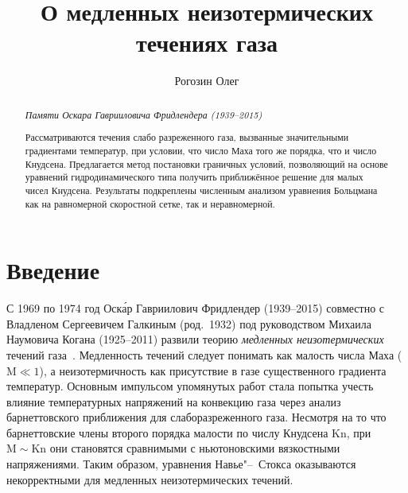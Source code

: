 \documentclass[10pt]{article}
\title{О медленных неизотермических течениях газа}
\author{Рогозин Олег}
\date{}
\newcommand{\Kn}{\mathrm{Kn}}
\newcommand{\Ma}{\mathrm{M}}
\begin{document}
\maketitle
\begin{abstract}
\begin{flushright}
\vspace{1em}
{\it Памяти Оскара Гаврииловича Фридлендера (1939--2015)}
\vspace{1em}
\end{flushright}
Рассматриваются течения слабо разреженного газа, вызванные значительными градиентами температур,
при условии, что число Маха того же порядка, что и число Кнудсена.
Предлагается метод постановки граничных условий,
позволяющий на основе уравнений гидродинамического типа
получить приближённое решение для малых чисел Кнудсена.
Результаты подкреплены численным анализом уравнения Больцмана
как на равномерной скоростной сетке, так и неравномерной.
\end{abstract}

\tableofcontents

\section{Введение}

С 1969 по 1974 год Оск\'{а}р Гавриилович Фридлендер (1939--2015)
совместно с Владленом Сергеевичем Галкиным (род.~1932)
под руководством Михаила Наумовича Когана (1925--2011)
развили теорию \emph{медленных неизотермических}
течений газа~\cite{Kogan1970, Kogan1971, Kogan1972, Friedlander1974, Kogan1976}.
Медленность течений следует понимать как малость числа Маха (\(\Ma\ll1\)),
а неизотермичность как присутствие в газе существенного градиента температур.
Основным импульсом упомянутых работ стала попытка учесть влияние температурных напряжений
на конвекцию газа через анализ барнеттовского приближения для слаборазреженного газа.
Несмотря на то что барнеттовские члены второго порядка малости по числу Кнудсена \(\Kn\),
при \(\Ma\sim\Kn\) они становятся сравнимыми с ньютоновскими вязкостными напряжениями.
Таким образом, уравнения Навье"--~Стокса оказываются некорректными для медленных
неизотермических течений.
\end{document}
